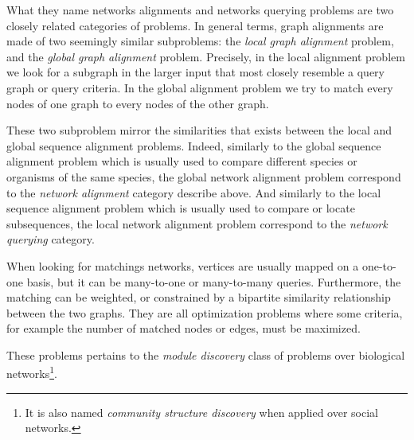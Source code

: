 	What they name networks alignments and networks querying problems are two closely related categories of problems.
	In general terms, graph alignments are made of two seemingly similar subproblems: the \emph{local graph alignment} problem, and the \emph{global graph alignment} problem.
	Precisely, in the local alignment problem we look for a subgraph in the larger input that most closely resemble a query graph or query criteria.
	In the global alignment problem we try to match every nodes of one graph to every nodes of the other graph.

	These two subproblem mirror the similarities that exists between the local and global sequence alignment problems.
	Indeed, similarly to the global sequence alignment problem which is usually used to compare different species or organisms of the same species, the global network alignment problem correspond to the \emph{network alignment} category describe above.
	And similarly to the local sequence alignment problem which is usually used to compare or locate subsequences, the local network alignment problem correspond to the \emph{network querying} category.

	When looking for matchings networks, vertices are usually mapped on a one-to-one basis, but it can be many-to-one or many-to-many queries.
	Furthermore, the matching can be weighted, or constrained by a bipartite similarity relationship between the two graphs.
	They are all optimization problems where some criteria, for example the number of matched nodes or edges, must be maximized.

	These problems pertains to the \emph{module discovery} class of problems over biological networks\footnote{It is also named \emph{community structure discovery} when applied over social networks.}.



